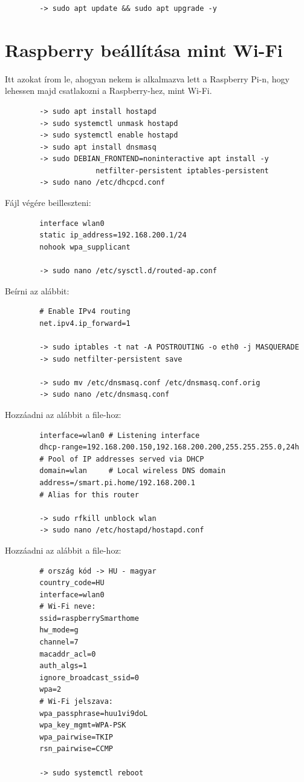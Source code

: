 \documentclass[
]{thesis-ekf}
\theoremstyle{definition}
\theoremstyle{remark}
\begin{document}
	\begin{verbatim}
		-> sudo apt update && sudo apt upgrade -y
	\end{verbatim}
	\section{Raspberry beállítása mint Wi-Fi}
	Itt azokat írom le, ahogyan nekem is alkalmazva lett a Raspberry Pi-n, hogy lehessen majd csatlakozni a Raspberry-hez, mint Wi-Fi.
	\begin{verbatim}
		-> sudo apt install hostapd
		-> sudo systemctl unmask hostapd
		-> sudo systemctl enable hostapd
		-> sudo apt install dnsmasq
		-> sudo DEBIAN_FRONTEND=noninteractive apt install -y
					 netfilter-persistent iptables-persistent
		-> sudo nano /etc/dhcpcd.conf
	\end{verbatim}
	Fájl végére beilleszteni: 
	\begin{verbatim}
		interface wlan0
		static ip_address=192.168.200.1/24
		nohook wpa_supplicant
		
		-> sudo nano /etc/sysctl.d/routed-ap.conf
	\end{verbatim}
	Beírni az alábbit:
	\begin{verbatim}
		# Enable IPv4 routing
		net.ipv4.ip_forward=1
		
		-> sudo iptables -t nat -A POSTROUTING -o eth0 -j MASQUERADE
		-> sudo netfilter-persistent save
		
		-> sudo mv /etc/dnsmasq.conf /etc/dnsmasq.conf.orig
		-> sudo nano /etc/dnsmasq.conf
	\end{verbatim}
	Hozzáadni az alábbit a file-hoz:
	\begin{verbatim}
		interface=wlan0 # Listening interface
		dhcp-range=192.168.200.150,192.168.200.200,255.255.255.0,24h
		# Pool of IP addresses served via DHCP
		domain=wlan     # Local wireless DNS domain
		address=/smart.pi.home/192.168.200.1
		# Alias for this router
		
		-> sudo rfkill unblock wlan
		-> sudo nano /etc/hostapd/hostapd.conf
	\end{verbatim}
	Hozzáadni az alábbit a file-hoz:
	\begin{verbatim}
		# ország kód -> HU - magyar
		country_code=HU
		interface=wlan0
		# Wi-Fi neve:
		ssid=raspberrySmarthome
		hw_mode=g
		channel=7
		macaddr_acl=0
		auth_algs=1
		ignore_broadcast_ssid=0
		wpa=2
		# Wi-Fi jelszava:
		wpa_passphrase=huu1vi9doL
		wpa_key_mgmt=WPA-PSK
		wpa_pairwise=TKIP
		rsn_pairwise=CCMP
		
		-> sudo systemctl reboot
	\end{verbatim}\cite{raspberry-as-wifi}
\end{document}
